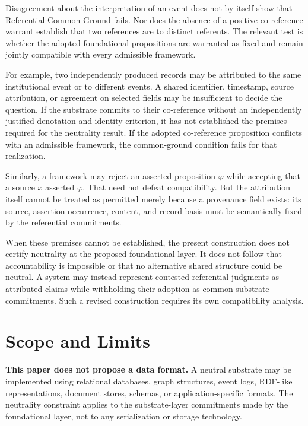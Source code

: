 \documentclass[11pt]{article}
\theoremstyle{plain}
\theoremstyle{definition}
\theoremstyle{remark}
\begin{document}
Disagreement about the interpretation of an event does not by itself
show that Referential Common Ground fails.
Nor does the absence of a positive co-reference warrant establish
that two references are to distinct referents.
The relevant test is whether the adopted foundational propositions
are warranted as fixed and remain jointly compatible with every
admissible framework.

For example, two independently produced records may be attributed
to the same institutional event or to different events.
A shared identifier, timestamp, source attribution, or agreement
on selected fields may be insufficient to decide the question.
If the substrate commits to their co-reference without an independently
justified denotation and identity criterion, it has not established the
premises required for the neutrality result.
If the adopted co-reference proposition conflicts with an admissible
framework, the common-ground condition fails for that realization.

Similarly, a framework may reject an asserted proposition $\varphi$
while accepting that a source $x$ asserted $\varphi$.
That need not defeat compatibility.
But the attribution itself cannot be treated as permitted merely
because a provenance field exists:
its source, assertion occurrence, content, and record basis
must be semantically fixed by the referential commitments.

When these premises cannot be established, the present construction
does not certify neutrality at the proposed foundational layer.
It does not follow that accountability is impossible or that no
alternative shared structure could be neutral.
A system may instead represent contested referential judgments
as attributed claims while withholding their adoption as common
substrate commitments.
Such a revised construction requires its own compatibility analysis.

\section{Scope and Limits}
\label{sec:non-goals}

\textbf{This paper does not propose a data format.}
A neutral substrate may be implemented using relational databases,
graph structures, event logs, RDF-like representations,
document stores, schemas, or application-specific formats.
The neutrality constraint applies to the substrate-layer commitments
made by the foundational layer,
not to any serialization or storage technology.
\end{document}
